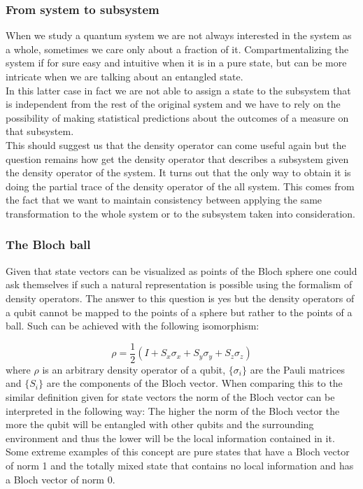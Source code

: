 \documentclass{article}
\begin{document}
\subsubsection{From system to subsystem}

When we study a quantum system we are not always interested in the
system as a whole, sometimes we care only about a fraction of it.
Compartmentalizing the system if for sure easy and intuitive when it
is in a pure state, but can be more intricate when we are talking about
an entangled state.\\
In this latter case in fact we are not able to assign a state to the
subsystem that is independent from the rest of the original system
and we have to rely on the possibility of making statistical
predictions about the outcomes of a measure on that subsystem.\\
This should suggest us that the density operator can come useful
again but the question remains how get the density operator that
describes a subsystem given the density operator of the system.
It turns out that the only way to obtain it is doing the partial
trace of the density operator of the all system.
This comes from the fact that we want to maintain consistency between
applying the same transformation to the whole system or to the
subsystem taken into consideration.

\subsubsection{The Bloch ball}

Given that state vectors can be visualized as points of the Bloch sphere
one could ask themselves if such a natural representation is possible
using the formalism of density operators.
The answer to this question is yes but the density operators of a qubit
cannot be mapped to the points of a sphere but rather to the points of
a ball.
Such can be achieved with the following isomorphism:

\begin{equation}
	\rho = \dfrac{1}{2}(I + S_x \sigma_x + S_y \sigma_y + S_z \sigma_z)
\end{equation}
where $\rho$ is an arbitrary density operator of a qubit, $\{\sigma_i\}$ are
the Pauli matrices and $\{S_i\}$ are the components of the Bloch vector.
When comparing this to the similar definition given for state vectors
the norm of the Bloch vector can be interpreted in the following way:
The higher the norm of the Bloch vector the more the qubit will be
entangled with other qubits and the surrounding environment and thus the
lower will be the local information contained in it.
Some extreme examples of this concept are pure states that have a Bloch
vector of norm 1 and the totally mixed state that contains no local
information and has a Bloch vector of norm 0.
\end{document}

